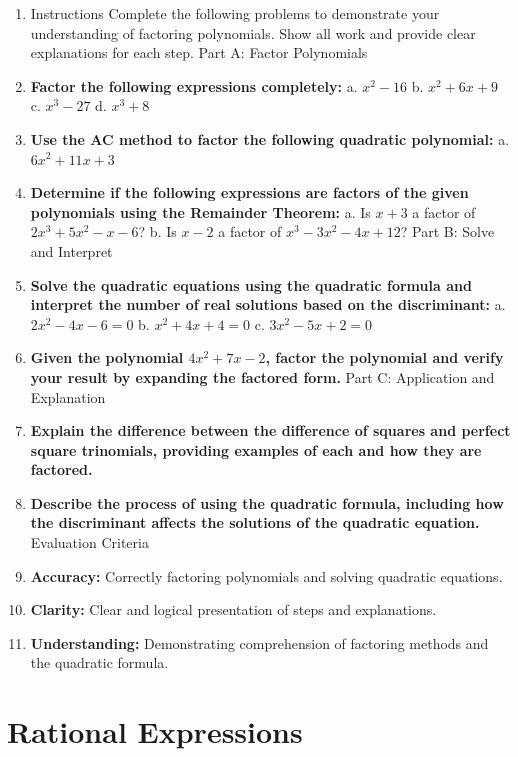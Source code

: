 \begin{enumerate}
    \item Instructions Complete the following problems to demonstrate your understanding of factoring polynomials. Show all work and provide clear explanations for each step. Part A: Factor Polynomials
    \item \textbf{Factor the following expressions completely:} a. $x^2 - 16$ b. $x^2 + 6x + 9$ c. $x^3 - 27$ d. $x^3 + 8$
    \item \textbf{Use the AC method to factor the following quadratic polynomial:} a. $6x^2 + 11x + 3$
    \item \textbf{Determine if the following expressions are factors of the given polynomials using the Remainder Theorem:} a. Is $x + 3$ a factor of $2x^3 + 5x^2 - x - 6$? b. Is $x - 2$ a factor of $x^3 - 3x^2 - 4x + 12$? Part B: Solve and Interpret
    \item \textbf{Solve the quadratic equations using the quadratic formula and interpret the number of real solutions based on the discriminant:} a. $2x^2 - 4x - 6 = 0$ b. $x^2 + 4x + 4 = 0$ c. $3x^2 - 5x + 2 = 0$
    \item \textbf{Given the polynomial $4x^2 + 7x - 2$, factor the polynomial and verify your result by expanding the factored form.} Part C: Application and Explanation
    \item \textbf{Explain the difference between the difference of squares and perfect square trinomials, providing examples of each and how they are factored.}
    \item \textbf{Describe the process of using the quadratic formula, including how the discriminant affects the solutions of the quadratic equation.} Evaluation Criteria
    \item \textbf{Accuracy:} Correctly factoring polynomials and solving quadratic equations.
    \item \textbf{Clarity:} Clear and logical presentation of steps and explanations.
    \item \textbf{Understanding:} Demonstrating comprehension of factoring methods and the quadratic formula.
\end{enumerate}

\section{Rational Expressions}
\label{sec:rational-expressions}

